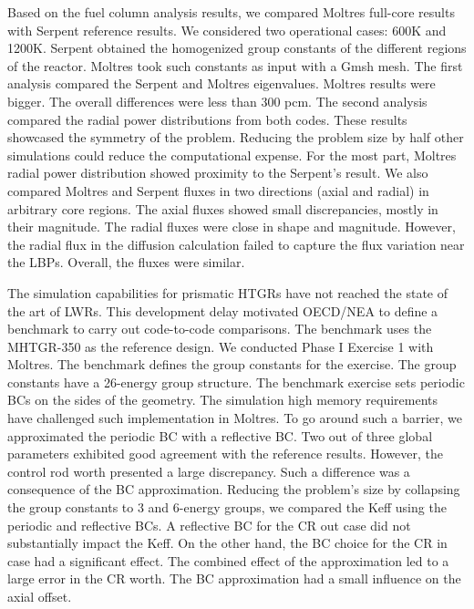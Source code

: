 Based on the fuel column analysis results, we compared Moltres full-core results with Serpent reference results.
We considered two operational cases: 600K and 1200K.
Serpent obtained the homogenized group constants of the different regions of the reactor.
Moltres took such constants as input with a Gmsh mesh.
The first analysis compared the Serpent and Moltres eigenvalues.
Moltres results were bigger.
The overall differences were less than 300 pcm.
The second analysis compared the radial power distributions from both codes.
These results showcased the symmetry of the problem.
Reducing the problem size by half other simulations could reduce the computational expense.
For the most part, Moltres radial power distribution showed proximity to the Serpent's result.
We also compared Moltres and Serpent fluxes in two directions (axial and radial) in arbitrary core regions.
The axial fluxes showed small discrepancies, mostly in their magnitude.
The radial fluxes were close in shape and magnitude.
However, the radial flux in the diffusion calculation failed to capture the flux variation near the LBPs.
Overall, the fluxes were similar.

The simulation capabilities for prismatic HTGRs have not reached the state of the art of LWRs.
This development delay motivated OECD/NEA to define a benchmark to carry out code-to-code comparisons.
The benchmark uses the MHTGR-350 as the reference design.
We conducted Phase I Exercise 1 with Moltres.
The benchmark defines the group constants for the exercise.
The group constants have a 26-energy group structure.
The benchmark exercise sets periodic \glspl{BC} on the sides of the geometry.
The simulation high memory requirements have challenged such implementation in Moltres. 
To go around such a barrier, we approximated the periodic \gls{BC} with a reflective BC.
Two out of three global parameters exhibited good agreement with the reference results.
However, the control rod worth presented a large discrepancy.
Such a difference was a consequence of the BC approximation.
Reducing the problem's size by collapsing the group constants to 3 and 6-energy groups, we compared the \gls{Keff} using the periodic and reflective BCs.
A reflective BC for the \gls{CR} out case did not substantially impact the \gls{Keff}.
On the other hand, the BC choice for the CR in case had a significant effect.
The combined effect of the approximation led to a large error in the CR worth.
The BC approximation had a small influence on the axial offset.